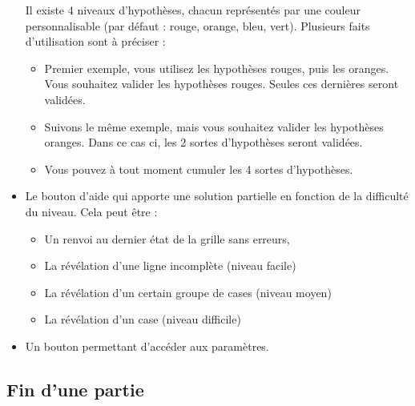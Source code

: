\documentclass[a4paper, 12pt]{report}
\begin{document}
\begin{itemize}
                Il existe 4 niveaux d'hypothèses, chacun représentés par une couleur personnalisable (par défaut : rouge, orange, bleu, vert).
                Plusieurs faits d'utilisation sont à préciser :
                \begin{itemize}
                    \item Premier exemple, vous utilisez les hypothèses rouges, puis les oranges. Vous souhaitez valider les hypothèses rouges. Seules ces dernières seront validées.
                    \item Suivons le même exemple, mais vous souhaitez valider les hypothèses oranges. Dans ce cas ci, les 2 sortes d'hypothèses seront validées.
                    \item Vous pouvez à tout moment cumuler les 4 sortes d'hypothèses.
                \end{itemize}
                \item Le bouton d'aide qui apporte une solution partielle en fonction de la difficulté du niveau. Cela peut être :
                \begin{itemize}
                    \item Un renvoi au dernier état de la grille sans erreurs,
                    \item La révélation d'une ligne incomplète (niveau facile)
                    \item La révélation d'un certain groupe de cases (niveau moyen)
                    \item La révélation d'un case (niveau difficile)
                \end{itemize}
                \item Un bouton permettant d'accéder aux paramètres.
            \end{itemize}
            

        \subsection{Fin d'une partie}
        
\end{document}
